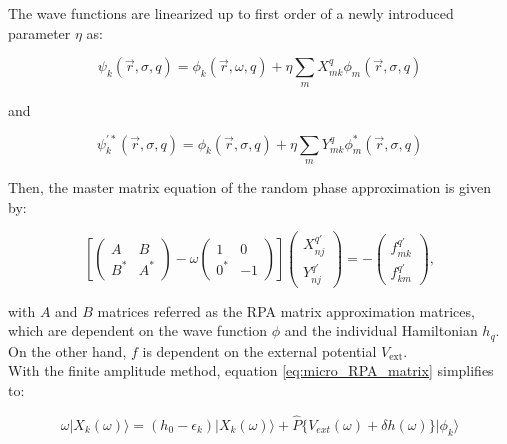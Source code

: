 \documentclass[openany]{book}
\begin{document}
The wave functions are linearized up to first order of a newly introduced parameter $\eta$ as: 

\begin{equation}\label{eq:micro_RPA_linearization_X}
	\psi_k(\vec r, \sigma, q) = \phi_k(\vec r, \omega, q) +  \eta \sum_{m}X^{q}_{mk} \phi_m(\vec r, \sigma, q)
\end{equation} 

and 

\begin{equation}\label{eq:micro_RPA_linearization_Y}
	\psi^{'*}_k(\vec r, \sigma, q) = \phi_k(\vec r, \sigma, q) +  \eta \sum_{m}Y^{q}_{mk} \phi^{*}_m(\vec r, \sigma, q)
\end{equation} 

Then, the master matrix equation of the random phase approximation is given by: 

\begin{equation}\label{eq:micro_RPA_matrix}
	\left[ \left(\begin{matrix}
		A & B \\
		B^{*} & A^{*}
	\end{matrix}\right) - \omega \left(\begin{matrix}
		1 & 0 \\
		0^{*} & -1
	\end{matrix}\right)  \right] \left( \begin{matrix}
		X^{q'}_{nj} \\
		Y^{q'}_{nj}
	\end{matrix}\right) = - \left( \begin{matrix}
		f^{q'}_{mk} \\
		f^{q'}_{km}
	\end{matrix}\right),
\end{equation}

with $A$ and $B$ matrices referred as the RPA matrix approximation matrices, which are dependent on the wave function $\phi$ and the individual Hamiltonian $h_q$. On the other hand,  $f$ is dependent on the external potential $V_{\mathrm{ext}}$. \\ 

With the finite amplitude method, equation \ref{eq:micro_RPA_matrix} simplifies to: 

\begin{equation}\label{eq:micro_FAM_X}
	\omega | X_k(\omega) \rangle = (h_0 - \epsilon_k) | X_k(\omega) \rangle + \hat {P} \{V_{ext}(\omega) + \delta h (\omega)\} |\phi_k \rangle 
\end{equation}
\end{document}
